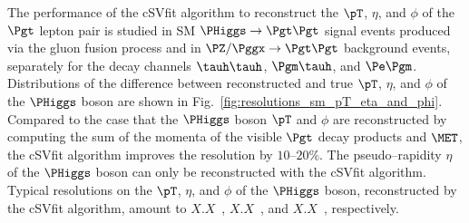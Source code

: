 The performance of the cSVfit algorithm to reconstruct the $\pT$,
$\eta$, and $\phi$ of the $\Pgt$ lepton pair is studied in SM $\PHiggs
\to \Pgt\Pgt$ signal events produced via the gluon fusion process
and in $\PZ/\Pggx \to \Pgt\Pgt$ background events,
separately for the decay channels $\tauh\tauh$, $\Pgm\tauh$, and $\Pe\Pgm$.
Distributions of the difference between reconstructed and true $\pT$,
$\eta$, and $\phi$ of the $\PHiggs$ boson are shown in
Fig.~\ref{fig:resolutions_sm_pT_eta_and_phi}.
Compared to the case that the $\PHiggs$ boson $\pT$ and $\phi$ are
reconstructed by computing the sum of the momenta of the visible $\Pgt$
decay products and $\MET$, the cSVfit algorithm improves the
resolution by $10$--$20\%$. The pseudo--rapidity $\eta$ of the
$\PHiggs$ boson can only be reconstructed with the cSVfit algorithm.
Typical resolutions on the $\pT$, $\eta$, and $\phi$ of the $\PHiggs$ boson,
reconstructed by the cSVfit algorithm, amount to $X.X$~\GeV, $X.X$~\mrad, and $X.X$~\mrad,
respectively.

